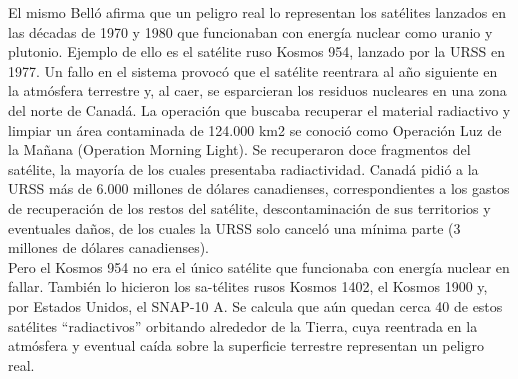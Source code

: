 \documentclass[12pt,letterpaper]{article}
\begin{document}
\begin{multicols}{2}
\noindent El mismo Belló afirma que un peligro real lo representan los satélites lanzados en las décadas de 1970 y 1980 que funcionaban con energía nuclear como uranio y plutonio. Ejemplo de ello es el satélite ruso Kosmos 954, lanzado por  la  URSS  en  1977.  Un  fallo  en  el  sistema  provocó  que el satélite reentrara al año siguiente en la atmósfera terrestre y, al caer, se esparcieran los residuos nucleares en  una  zona  del  norte  de  Canadá.  La  operación  que  buscaba  recuperar  el  material  radiactivo  y  limpiar  un  área  contaminada  de  124.000  km2  se  conoció  como  Operación Luz de la Mañana (Operation Morning Light). Se recuperaron doce fragmentos del satélite, la mayoría de  los  cuales  presentaba  radiactividad.  Canadá  pidió  a  la URSS más de 6.000 millones de dólares canadienses, correspondientes  a  los  gastos  de  recuperación  de  los  restos  del  satélite,  descontaminación  de  sus  territorios  y eventuales daños, de los cuales la URSS solo canceló una mínima parte (3 millones de dólares canadienses).
\\

\noindent Pero el Kosmos 954 no era el único satélite que funcionaba con energía nuclear en fallar. También lo hicieron los sa-télites rusos Kosmos 1402, el Kosmos 1900 y, por Estados Unidos, el SNAP-10 A. Se calcula que aún quedan cerca 40 de estos satélites “radiactivos” orbitando alrededor de la Tierra, cuya reentrada en la atmósfera y eventual caída sobre la superficie terrestre representan un peligro real.
\newpage 

\end{multicols}
\pagestyle{fancy}
        \fancyhf{}
        \rhead{}
\end{document}
